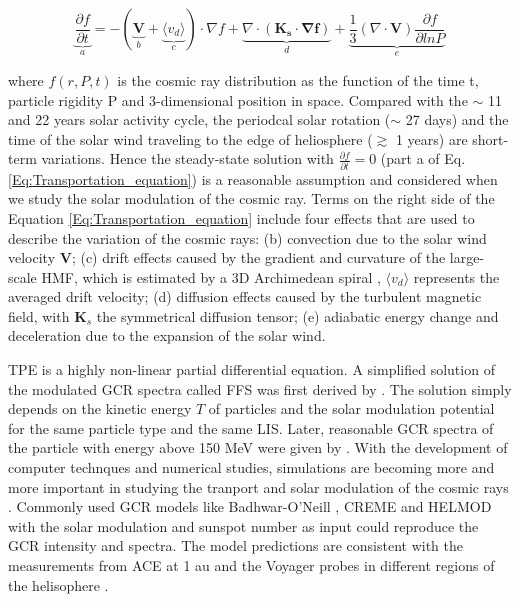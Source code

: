	\begin{equation}
		\underbrace{\frac{\partial f}{\partial t}}_{a} = - ( \underbrace{\boldsymbol{V}}_{b} + \underbrace{\langle v_d \rangle }_{c}) \cdot \nabla f + \underbrace{\nabla \cdot (\boldsymbol{K_s \cdot \nabla f})}_{d} + \underbrace{\frac{1}{3}(\nabla \cdot \boldsymbol{V}) \frac{\partial f}{\partial ln P}}_{e}
		\label{Eq:Transportation_equation}
	\end{equation}

where $f(r, P, t)$ is the cosmic ray distribution as the function of the time t, particle rigidity P and 3-dimensional position in space. Compared with the $\sim$ 11  and 22 years solar activity cycle, the periodcal solar rotation ($\sim$ 27 days) and  the time of the solar wind traveling to the edge of heliosphere ($\gtrsim$ 1 years) are short-term variations. Hence the steady-state solution with  $\frac{\partial f}{\partial t} = 0$ (part a of Eq.\ref{Eq:Transportation_equation}) is a reasonable assumption and considered when we study the solar modulation of the cosmic ray. Terms on the right side of the Equation \ref{Eq:Transportation_equation} include four effects that are used to describe the variation of the cosmic rays: (b) convection due to the solar wind velocity $\boldsymbol{V}$; (c) drift effects caused by the gradient and curvature of the large-scale \ac{HMF}, which is estimated by a 3D Archimedean spiral \citep{Parker-1958}, $\langle v_d \rangle$ represents the averaged drift velocity; (d) diffusion effects caused by the turbulent magnetic field, with $\boldsymbol{K}_s$ the symmetrical diffusion tensor; (e) adiabatic energy change and deceleration due to the expansion of the solar wind. 

\ac{TPE} is a highly non-linear partial differential equation. A simplified solution of the modulated \ac{GCR} spectra called \ac{FFS} was first derived by \citet{Gleeson1967ApJ, Gleeson1968ApJ}. The solution simply depends on the kinetic energy $T$ of particles and the solar modulation potential for the same particle type and the same \ac{LIS}.
Later, reasonable \ac{GCR} spectra of the particle with energy above 150 MeV were given by \citet{Gleeson1973ApSS}.
With the development of computer technques and numerical studies, simulations are becoming more and more important in studying the tranport and solar modulation of the cosmic rays \citep{Jokipii1979ApJ, LeRoux1995ApJ, Manuel2011AdSpR, Potgieter2013LRSP, Vos2015ApJ, Vos2016SoPh,Boschini2019AdSpR, Boschini2022AdSpR, 
Corti2019ApJ, Shen2019ApJ}. 
Commonly used \ac{GCR} models like Badhwar-O'Neill \citep{Oneill2006AdSpR,ONeill2015, Slaba2020SpWea}, CREME \citep{Tylka1997ITNS,Weller2010ITNS} and HELMOD \citep{Boschini2018AdSpR} with the solar modulation and sunspot number as input could reproduce the GCR intensity and spectra. The model predictions are consistent with the measurements from \ac{ACE} at 1 au and the Voyager probes in different regions of the helisophere \citep{Boschini2019AdSpR}.

